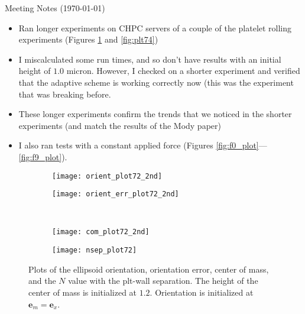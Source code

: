 \documentclass{article}
\newcommand{\vect}[1]{\boldsymbol{\mathbf{#1}}}
\begin{document}
\pagestyle{plain}

\begin{center}
  {\Large Meeting Notes (\today)}
\end{center}

\begin{itemize}
\item Ran longer experiments on CHPC servers of a couple of the
  platelet rolling experiments (Figures \ref{fig:plt72} and \ref{fig:plt74})
\item I miscalculated some run times, and so don't have results with
  an initial height of $1.0$ micron. However, I checked on a shorter
  experiment and verified that the adaptive scheme is working
  correctly now (this was the experiment that was breaking before.
\item These longer experiments confirm the trends that we noticed in
  the shorter experiments (and match the results of the Mody paper)
\item I also ran tests with a constant applied force (Figures
  \ref{fig:f0_plot}---\ref{fig:f9_plot}).
\end{itemize}

\begin{figure}[b]
  \centering
  \begin{subfigure}{0.49\textwidth}
    \texttt{[image: orient\_plot72\_2nd]}
  \end{subfigure}
  \hfill
  \begin{subfigure}{0.49\textwidth}
    \texttt{[image: orient\_err\_plot72\_2nd]}
  \end{subfigure}
  \\
  \begin{subfigure}{0.49\textwidth}
    \texttt{[image: com\_plot72\_2nd]}
  \end{subfigure}
  \hfill
  \begin{subfigure}{0.49\textwidth}
    \texttt{[image: nsep\_plot72]}
  \end{subfigure}  
  \caption{Plots of the ellipsoid orientation, orientation error,
    center of mass, and the $N$ value with the plt-wall
    separation. The height of the center of mass is initialized at
    $1.2$. Orientation is initialized at $\vect{e}_m =
    \vect{e}_x$.}
  \label{fig:plt72}
\end{figure}
\end{document}
